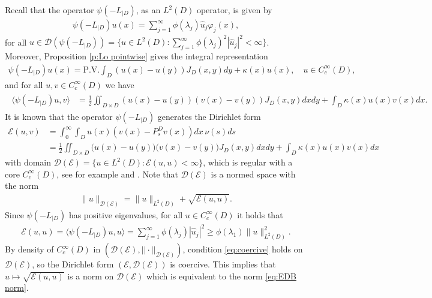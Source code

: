 \documentclass[12pt,a4paper,onecolumn]{article}
\theoremstyle{definition}
\newcommand{\1}{\mathbf 1}
\newcommand{\wh}{\widehat}
\newcommand{\la}{\langle}
\newcommand{\ra}{\rangle}
\newcommand{\EE}{\mathcal{E}}
\newcommand{\DD}{\mathcal{D}}
\newcommand{\Lo}{\psi(-L_{|D})}
\numberwithin{equation}{section}
\begin{document}
Recall that the operator $\Lo$, as an $L^2(D)$ operator, is given by
\begin{align*}
    \Lo u(x)=\sum_{j=1}^\infty \phi(\lambda_j)\wh u_j\varphi_j(x),
\end{align*}
for all $u\in \DD(\Lo)=\{u\in L^2(D): \sum_{j=1}^\infty \phi(\lambda_j)^2|\wh u_j|^2<\infty\}$. Moreover, Proposition \ref{p:Lo pointwise} gives the integral representation
\begin{align*}
    \Lo u(x)=\textrm{P.V.}\int_D(u(x)-u(y))J_D(x,y)dy+\kappa(x)u(x), \quad u\in C_c^\infty(D),
\end{align*}
and for all $u,v\in C_c^\infty(D)$ we have
\begin{align*}
\begin{split}
    \la\Lo u,v\ra&=\frac12\iint_{D\times D}(u(x)-u(y))(v(x)-v(y))J_D(x,y)dxdy+\int_D\kappa(x)u(x)v(x)dx.
\end{split}
\end{align*}
It is known that the operator $\Lo$ generates the Dirichlet form
\begin{align*}
    \EE(u,v)&=\int_0^\infty\int_D u(x)(v(x) -P_s^D v(x))dx\, \nu(s)ds\\
    &=\frac12\iint_{D\times D}\big(u(x)-u(y)\big)\big(v(x)-v(y)\big)J_D(x,y)dxdy+\int_D\kappa(x)u(x)v(x)dx
\end{align*}
with domain $\DD(\EE)= \{u\in L^2(D): \EE(u,u)<\infty\}$, which is regular with a core $C_c^\infty(D)$, see for example \cite[Section 13.4]{bernstein} and \cite[Theorem 2.1]{Okura}. Note that $\DD(\EE)$ is a normed space with the norm
\begin{align}\label{eq:EDB norm}
    \| u \|_{\DD(\EE)}=\| u \|_{L^2(D)}+\sqrt{\EE(u,u)}.
\end{align}
Since $\Lo$ has positive eigenvalues, for all $u\in C_c^\infty(D)$ it holds that 
\begin{align}\label{eq:coercive}
    \EE(u,u)=\la \Lo u, u\ra =\sum_{j=1}^\infty \phi(\lambda_j)|\wh u_j|^2\ge \phi(\lambda_1)\| u\|^2_{L^2(D)}.
\end{align}
By density of $C_c^\infty(D)$ in $(\DD(\EE),||\cdot||_{\DD(\EE)})$, condition \eqref{eq:coercive} holds on $\DD(\EE)$, so the Dirichlet form $(\EE,\DD(\EE))$ is coercive. This implies that $u\mapsto \sqrt{\EE(u,u)}$ is a norm on $\DD(\EE)$ which is equivalent to the norm \eqref{eq:EDB norm}.
\end{document}
